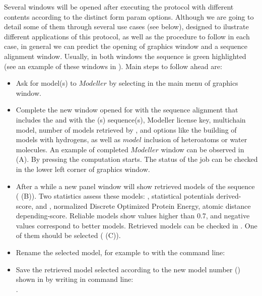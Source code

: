 \begin{itemize}
  Several \chimera windows will be opened after executing the protocol with different contents according to the distinct form param options. Although we are going to detail some of them through several use cases (see below), designed to ilustrate different applications of this protocol, as well as the procedure to follow in each case, in general we can predict the opening of \chimera graphics window and a sequence alignment window. Usually, in both windows the  sequence is green highlighted (see an example of these windows in ). Main steps to follow ahead are:
            \begin{itemize}
            \item Ask for model(s) to $Modeller$ by selecting  in the main menu of \chimera graphics window. 
            \item Complete the new window opened for  with the sequence alignment that includes the  and with the (s) sequence(s), Modeller license key, multichain model, number of models retrieved by \modeller, and  options like the building of models with hydrogens, as well as $model$ inclusion of heteroatoms or water molecules. An example of completed $Modeller$ window can be observed in  (A). By pressing  the computation starts. The status of the job can be checked in the lower left corner of \chimera graphics window.
            \item After a while a new panel window will show retrieved models of the  sequence ( (B)). Two statistics assess these models: , statistical potentials derived-score, and , normalized Discrete Optimized Protein Energy, atomic distance depending-score. Reliable models show  values higher than 0.7, and negative  values correspond to better models.  Retrieved models can be checked in \chimera {}. One of them should be selected ( (C)).
            \item Rename the selected model, for example  to  with the command line:\\ 
            \item Save the retrieved model selected according to the new model number () shown in \chimera {} by writing in \chimera command line:\\.
            \end{itemize}
  

\end{itemize}
